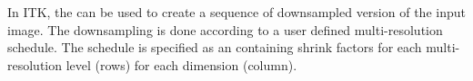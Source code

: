 


In ITK, the  can be used to create a
sequence of downsampled version of the input image.  The downsampling is done
according to a user defined multi-resolution schedule. The schedule is
specified as an  containing shrink factors for each
multi-resolution level (rows) for each dimension (column).



